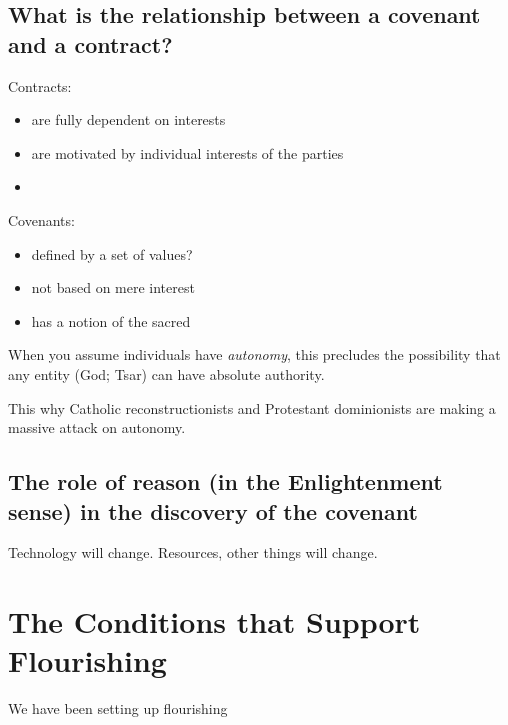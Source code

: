 \documentclass[
]{book}
\providecommand{\tightlist}{%
  \setlength{\itemsep}{0pt}\setlength{\parskip}{0pt}}
\begin{document}
\hypertarget{what-is-the-relationship-between-a-covenant-and-a-contract}{%
\section{What is the relationship between a covenant and a contract?}\label{what-is-the-relationship-between-a-covenant-and-a-contract}}

Contracts:

\begin{itemize}
\tightlist
\item
  are fully dependent on interests
\item
  are motivated by individual interests of the parties
\item
\end{itemize}

Covenants:

\begin{itemize}
\item
  defined by a set of values?
\item
  not based on mere interest
\item
  has a notion of the sacred
\end{itemize}

When you assume individuals have \emph{autonomy}, this precludes the
possibility that any entity (God; Tsar) can have absolute authority.

This why Catholic reconstructionists and Protestant dominionists are making a massive attack on autonomy.

\hypertarget{the-role-of-reason-in-the-enlightenment-sense-in-the-discovery-of-the-covenant}{%
\section{The role of reason (in the Enlightenment sense) in the discovery of the covenant}\label{the-role-of-reason-in-the-enlightenment-sense-in-the-discovery-of-the-covenant}}

Technology will change. Resources, other things will change.

\hypertarget{the-conditions-that-support-flourishing}{%
\chapter{The Conditions that Support Flourishing}\label{the-conditions-that-support-flourishing}}

We have been setting up flourishing
\end{document}
